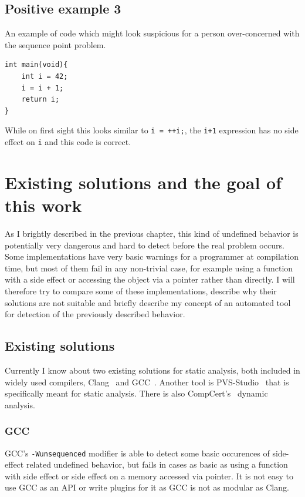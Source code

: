 \section{Positive example 3}
An example of code which might look suspicious for a person over-concerned with the sequence point problem.
\begin{lstlisting}
int main(void){
    int i = 42;
    i = i + 1;
    return i;
}
\end{lstlisting}
While on first sight this looks similar to \verb|i = ++i;|, the \verb|i+1| expression has no side effect on \verb|i| and this code is correct.

\chapter{Existing solutions and the goal of this work}
As I brightly described in the previous chapter, this kind of undefined behavior is potentially very dangerous and hard to detect before the real problem occurs. Some implementations have very basic warnings for a programmer at compilation time, but most of them fail in any non-trivial case, for example using a function with a side effect or accessing the object via a pointer rather than directly. I will therefore try to compare some of these implementations, describe why their solutions are not suitable and briefly describe my concept of an automated tool for detection of the previously described behavior.
\section{Existing solutions}
Currently I know about two existing solutions for static analysis, both included in widely used compilers, Clang~\cite{Clang} and GCC~\cite{GCC}. Another tool is PVS-Studio~\cite{PVSStudio} that is specifically meant for static analysis. There is also CompCert's~\cite{CompCert} dynamic analysis.
\subsection{GCC}
GCC's \verb|-Wunsequenced| modifier is able to detect some basic occurences of side-effect related undefined behavior, but fails in cases as basic as using a function with side effect or side effect on a memory accessed via pointer. It is not easy to use GCC as an API or write plugins for it as GCC is not as modular as Clang.~\cite{ClangComparison}

